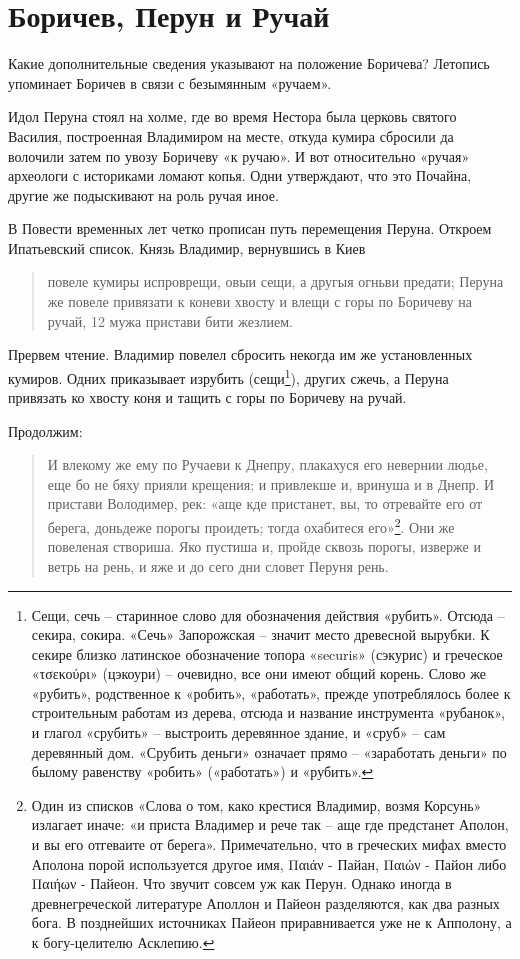 \chapter{Боричев, Перун и Ручай}

Какие дополнительные сведения указывают на положение Боричева? Летопись упоминает Боричев в связи с безымянным «ручаем».

Идол Перуна стоял на холме, где во время Нестора была церковь святого Василия, построенная Владимиром на месте, откуда кумира сбросили да волочили затем по увозу Боричеву «к ручаю». И вот относительно «ручая» археологи с историками ломают копья. Одни утверждают, что это Почайна, другие же подыскивают на роль ручая иное.

В Повести временных лет четко прописан путь перемещения Перуна. Откроем Ипатьевский список. Князь Владимир, вернувшись в Киев

\begin{quotation}
повеле кумиры испроврещи, овыи сещи, а другыя огньви предати; Перуна же повеле привязати к коневи хвосту и влещи с горы по Боричеву на ручай, 12 мужа пристави бити жезлием. 
\end{quotation}

Прервем чтение. Владимир повелел сбросить некогда им же установленных кумиров. Одних приказывает изрубить (сещи\footnote{Сещи, сечь – старинное слово для обозначения действия «рубить». Отсюда – секира, сокира. «Сечь» Запорожская – значит место древесной вырубки. К секире близко латинское обозначение топора «securis» (сэкурис) и греческое «τσεκούρι» (цэкоури) – очевидно, все они имеют общий корень. Слово же «рубить», родственное к «робить», «работать», прежде употреблялось более к строительным работам из дерева, отсюда и название инструмента «рубанок», и глагол «срубить» – выстроить деревянное здание, и «сруб» – сам деревянный дом. «Срубить деньги» означает прямо – «заработать деньги» по былому равенству «робить» («работать») и «рубить».}), других сжечь, а Перуна привязать ко хвосту коня и тащить с горы по Боричеву на ручай.

Продолжим:

\begin{quotation}
И влекому же ему по Ручаеви к Днепру, плакахуся его невернии людье, еще бо не бяху прияли крещения; и привлекше и, вринуша и в Днепр. И пристави Володимер, рек: «аще кде пристанет, вы, то отревайте его от берега, доньдеже порогы проидеть; тогда охабитеся его»\footnote{Один из списков «Слова о том, како крестися Владимир, возмя Корсунь» излагает иначе: «и приста Владимер и рече так – аще где предстанет Аполон, и вы его отгеваите от берега». Примечательно, что в греческих мифах вместо Аполона порой используется другое имя, Παιάν - Пайан, Παιών - Пайон либо Παιήων - Пайеон. Что звучит совсем уж как Перун. Однако иногда в древнегреческой литературе Аполлон и Пайеон разделяются, как два разных бога. В позднейших источниках Пайеон приравнивается уже не к Апполону, а к богу-целителю Асклепию.}. Они же повеленая створиша. Яко пустиша и, пройде сквозь порогы, изверже и ветрь на рень, и яже и до сего дни словет Перуня рень.
\end{quotation}

